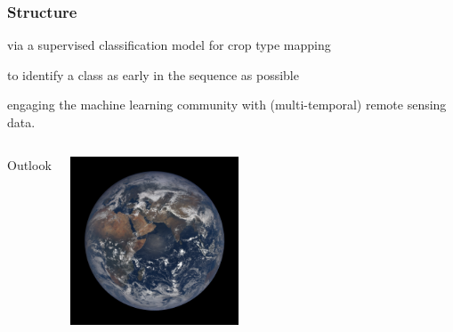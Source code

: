 \documentclass[%
  aspectratio=169,
  9pt,
  USenglish,
  titlegraphic, %
  affiliationintitlepagehead,
  progressbar,
]{beamer}
\begin{document}
\begin{frame}
\frametitle{Structure}

\Large

\begin{description}[itemsep=1em]
	\item<1->[Vegetation Monitoring] via a supervised classification model for crop type mapping
	\item<2->[Early Time Series Classification] to identify a class as early in the sequence as possible
	\item<3->[Compiling Datasets] engaging the machine learning community with (multi-temporal) remote sensing data.
\end{description}
\end{frame}















{
	\begin{frame}[plain]
	
	\vfill
	\Huge\color{white}
	\begin{center}
		\begin{columns}
			\vspace{7em}
			
			\hfill 
			Outlook
			
			\includegraphics[width=5cm]{images/epic1}
		\end{columns}
	\end{center}
	
	\vfill
\end{frame}
}
\end{document}
